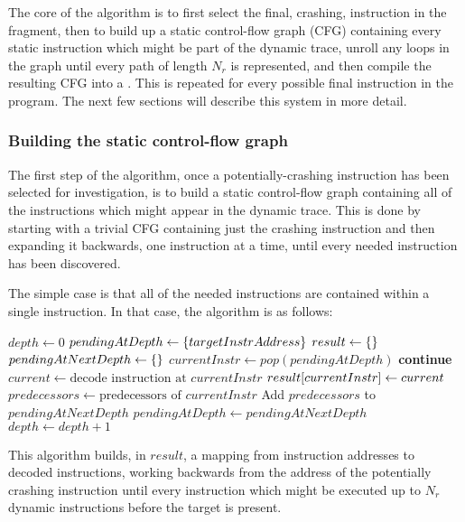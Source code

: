 \documentclass[12pt,a4paper]{book}
\begin{document}
The core of the algorithm is to first select the final, crashing, instruction in the fragment, then to build up a static control-flow graph (CFG) containing every static instruction which might be part of the dynamic trace, unroll any loops in the graph until every path of length $N_r$ is represented, and then compile the resulting CFG into a \StateMachine.
This is repeated for every possible final instruction in the program.
The next few sections will describe this system in more detail.

\subsubsection{Building the static control-flow graph}
The first step of the algorithm, once a potentially-crashing instruction has been selected for investigation, is to build a static control-flow graph containing all of the instructions which might appear in the dynamic trace.
This is done by starting with a trivial CFG containing just the crashing instruction and then expanding it backwards, one instruction at a time, until every needed instruction has been discovered.

The simple case is that all of the needed instructions are contained within a single instruction.
In that case, the algorithm is as follows:

\begin{algorithmic}[1]
\STATE $depth \gets 0$
\STATE $pendingAtDepth \gets \{targetInstrAddress\}$
\STATE $result \gets \{\}$
  \STATE $pendingAtNextDepth \gets \{\}$
    \STATE $currentInstr \gets pop(pendingAtDepth)$
      \STATE \textbf{continue}
    \ENDIF
    \STATE $current \gets \text{decode instruction at } currentInstr$
    \STATE $result[currentInstr] \gets current$
    \STATE $predecessors \gets \text{predecessors of } currentInstr$
    \STATE Add $predecessors$ to $pendingAtNextDepth$
  \ENDWHILE
  \STATE $pendingAtDepth \gets pendingAtNextDepth$
  \STATE $depth \gets depth + 1$
\ENDWHILE
\end{algorithmic}

This algorithm builds, in $result$, a mapping from instruction addresses to decoded instructions, working backwards from the address of the potentially crashing instruction until every instruction which might be executed up to $N_r$ dynamic instructions before the target is present.
\end{document}
